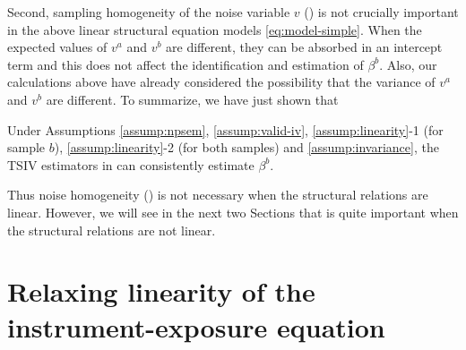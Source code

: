 \documentclass[preprint]{imsart}
\begin{document}
Second, sampling homogeneity of the noise variable $v$
() is not crucially important in the
above linear structural equation models \eqref{eq:model-simple}. When
the expected values of $v^a$ and $v^b$ are different, they can be
absorbed in an intercept term and this does not affect the identification
and estimation of $\beta^b$. Also, our calculations above have already
considered the possibility that the variance of $v^a$ and $v^b$ are
different. To summarize, we have just shown that

\begin{proposition} \label{prop:1}
  Under Assumptions \ref{assump:npsem}, \ref{assump:valid-iv},
  \ref{assump:linearity}-1 (for sample $b$),
  \ref{assump:linearity}-2 (for both samples) and
  \ref{assump:invariance}, the TSIV estimators in
   can consistently estimate $\beta^b$.
\end{proposition}

Thus noise homogeneity () is not necessary
when the structural relations are linear. However, we will see in the
next two Sections that  is quite
important when the structural relations are not linear.





\section{Relaxing linearity of the instrument-exposure equation}
\label{sec:relax-line-instr}
\end{document}
